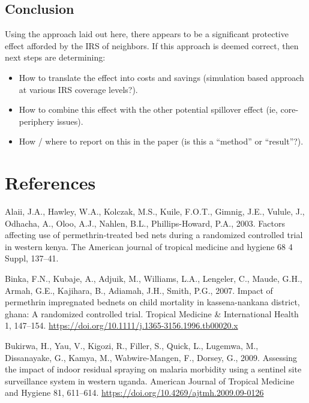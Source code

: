 \documentclass[]{article}
\providecommand{\tightlist}{%
  \setlength{\itemsep}{0pt}\setlength{\parskip}{0pt}}
\begin{document}
\subsection{Conclusion}\label{conclusion}

Using the approach laid out here, there appears to be a significant
protective effect afforded by the IRS of neighbors. If this approach is
deemed correct, then next steps are determining:

\begin{itemize}
\tightlist
\item
  How to translate the effect into costs and savings (simulation based
  approach at various IRS coverage levels?).
\item
  How to combine this effect with the other potential spillover effect
  (ie, core-periphery issues).
\item
  How / where to report on this in the paper (is this a ``method'' or
  ``result''?).
\end{itemize}

\section*{References}\label{references}

\hypertarget{refs}{}
\hypertarget{ref-Alaii2003FactorsAU}{}
Alaii, J.A., Hawley, W.A., Kolczak, M.S., Kuile, F.O.T., Gimnig, J.E.,
Vulule, J., Odhacha, A., Oloo, A.J., Nahlen, B.L., Phillips-Howard,
P.A., 2003. Factors affecting use of permethrin-treated bed nets during
a randomized controlled trial in western kenya. The American journal of
tropical medicine and hygiene 68 4 Suppl, 137--41.

\hypertarget{ref-Binka2007}{}
Binka, F.N., Kubaje, A., Adjuik, M., Williams, L.A., Lengeler, C.,
Maude, G.H., Armah, G.E., Kajihara, B., Adiamah, J.H., Smith, P.G.,
2007. Impact of permethrin impregnated bednets on child mortality in
kassena-nankana district, ghana: A randomized controlled trial. Tropical
Medicine \& International Health 1, 147--154.
\url{https://doi.org/10.1111/j.1365-3156.1996.tb00020.x}

\hypertarget{ref-Bukirwa2009}{}
Bukirwa, H., Yau, V., Kigozi, R., Filler, S., Quick, L., Lugemwa, M.,
Dissanayake, G., Kamya, M., Wabwire-Mangen, F., Dorsey, G., 2009.
Assessing the impact of indoor residual spraying on malaria morbidity
using a sentinel site surveillance system in western uganda. American
Journal of Tropical Medicine and Hygiene 81, 611--614.
\url{https://doi.org/10.4269/ajtmh.2009.09-0126}
\end{document}
